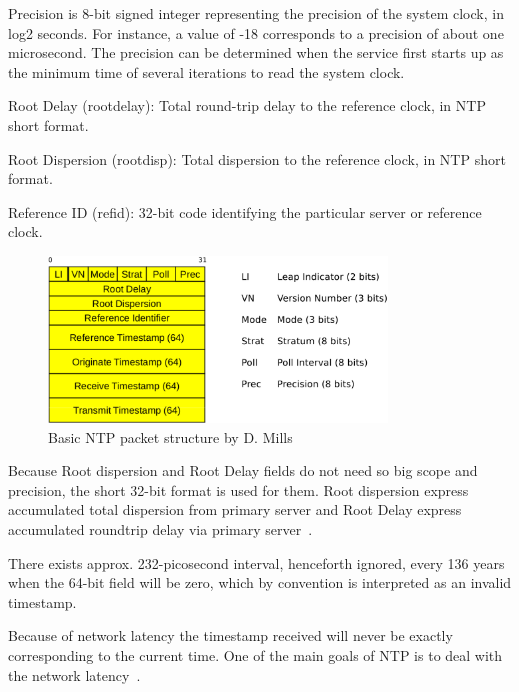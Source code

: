 Precision is 8-bit signed integer representing the precision of the
system clock, in log2 seconds.
For instance, a value of -18
corresponds to a precision of about one microsecond. %
The precision
can be determined when the service first starts up as the minimum
time of several iterations to read the system clock.
   
   
   
   Root Delay (rootdelay): Total round-trip delay to the reference
   clock, in NTP short format.

   Root Dispersion (rootdisp): Total dispersion to the reference clock,
   in NTP short format.

Reference ID (refid): 32-bit code identifying the particular server or reference clock.

\begin{figure}
	\centering
	\includegraphics[width=9cm,keepaspectratio]{fig/ntp-packet.pdf}
	\caption{Basic NTP packet structure by D. Mills}
	\label{fig:ntp-packet}
	\bigskip
\end{figure}

Because Root dispersion and Root Delay fields do not need so big scope and precision,
the short 32-bit format is used for them.
Root dispersion express accumulated total dispersion from primary server
and Root Delay express accumulated roundtrip delay via primary server~\cite{ntp-arch}.


There exists approx. 232-picosecond interval, henceforth ignored, every 136 years when
the 64-bit field will be zero, which by convention is interpreted as an invalid timestamp.

Because of network latency the timestamp received will never be exactly corresponding to
the current time.
One of the main goals of NTP is to deal with the network latency~\cite{ntp-overview}.
